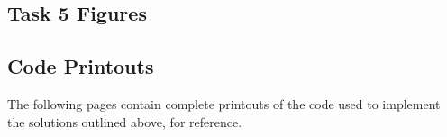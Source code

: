 \documentclass[conference]{IEEEtran}
\begin{document}
\subsection{Task 5 Figures}\label{app:T5}

\subsection{Code Printouts}
The following pages contain complete printouts of the code used to implement the solutions outlined above, for reference.
%
%
%
\end{document}
